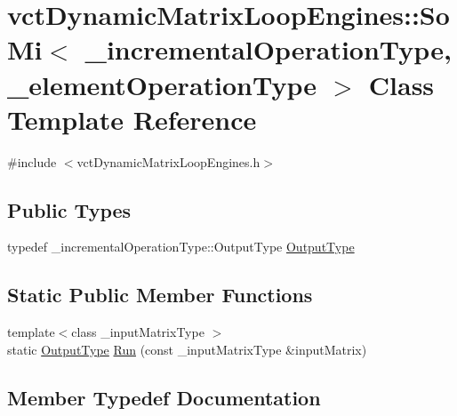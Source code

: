 \hypertarget{classvct_dynamic_matrix_loop_engines_1_1_so_mi}{}\section{vct\+Dynamic\+Matrix\+Loop\+Engines\+:\+:So\+Mi$<$ \+\_\+incremental\+Operation\+Type, \+\_\+element\+Operation\+Type $>$ Class Template Reference}
\label{classvct_dynamic_matrix_loop_engines_1_1_so_mi}


{\ttfamily \#include $<$vct\+Dynamic\+Matrix\+Loop\+Engines.\+h$>$}

\subsection*{Public Types}
\begin{DoxyCompactItemize}
\item 
typedef \+\_\+incremental\+Operation\+Type\+::\+Output\+Type \hyperlink{classvct_dynamic_matrix_loop_engines_1_1_so_mi_a60f9f491da83d44e573f32395ef9278f}{Output\+Type}
\end{DoxyCompactItemize}
\subsection*{Static Public Member Functions}
\begin{DoxyCompactItemize}
\item 
{\footnotesize template$<$class \+\_\+input\+Matrix\+Type $>$ }\\static \hyperlink{classvct_dynamic_matrix_loop_engines_1_1_so_mi_a60f9f491da83d44e573f32395ef9278f}{Output\+Type} \hyperlink{classvct_dynamic_matrix_loop_engines_1_1_so_mi_ac46380ec17c5a8474334e7ffe2f638a0}{Run} (const \+\_\+input\+Matrix\+Type \&input\+Matrix)
\end{DoxyCompactItemize}


\subsection{Member Typedef Documentation}
\hypertarget{classvct_dynamic_matrix_loop_engines_1_1_so_mi_a60f9f491da83d44e573f32395ef9278f}{}

